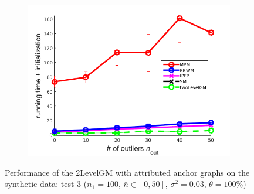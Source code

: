 \begin{figure}[h]
\begin{subfigure}[b]{0.3\textwidth}
			\includegraphics[scale=0.25]{"chapter3/fig/SyntheticTest/descr/Results_v4.3.3/Test1/time_summary_avg10t"} 
		\end{subfigure} 	
	\caption[Performance of the 2LevelGM with attributed anchor graphs on the synthetic data (test $3$)]{Performance of the 2LevelGM with attributed anchor graphs on the synthetic data: test $3$ ($n_1=100$, $\bar{n}\in[0,50]$, $\sigma^2=0.03$, $\theta=100\%$)}
	\label{fig:synTest3_descr_ver433}
\end{figure}
